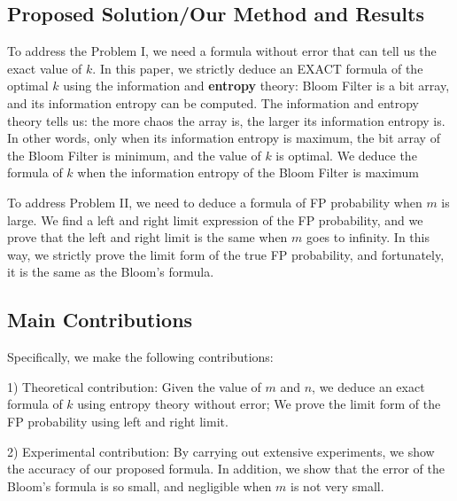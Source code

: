 \subsection{Proposed Solution/Our Method and Results}

To address the Problem I, we need a formula without error that can tell us the exact value of $k$. %
In this paper, we strictly deduce an EXACT formula of the optimal $k$ using the information and \textbf{entropy} theory: Bloom Filter is a bit array, and its information entropy can be computed. The information and entropy theory tells us: the more chaos the array is, the larger its information entropy is. In other words, only when its information entropy is maximum, the bit array of the Bloom Filter is minimum, and the value of $k$ is optimal. We deduce the formula of $k$ when the information entropy of the Bloom Filter is maximum

To address Problem II, we need to deduce a formula of FP probability when $m$ is large. We find a left and right limit expression of the FP probability, and we prove that the left and right limit is the same when $m$ goes to infinity. 
In this way, we strictly prove the limit form of the true FP probability, and fortunately, it is the same as the Bloom's formula.

\subsection{Main Contributions}

Specifically, we make the following contributions:

1) Theoretical contribution: Given the value of $m$ and $n$, we deduce an exact formula of $k$ using entropy theory without error; We prove the limit form of the FP probability using left and right limit.

2) Experimental contribution: By carrying out extensive experiments, we show the accuracy of our proposed formula. In addition, we show that the error of the Bloom's formula is so small, and negligible when $m$ is not very small.